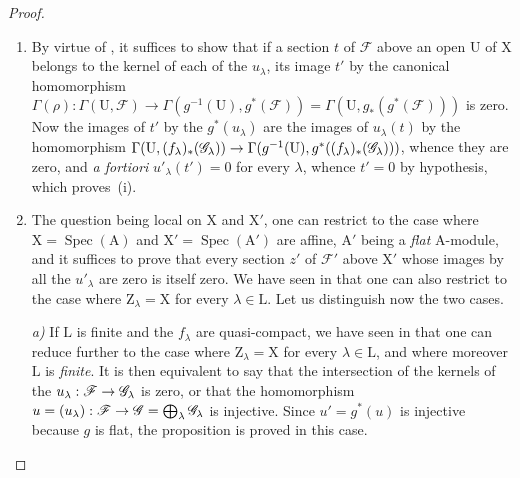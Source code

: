\begin{proof}
\begin{enumerate}[label=(\roman*)]
  \item By virtue of , it suffices to show that if a section $t$ of $\mathscr{F}$ above an open $\mathrm{U}$ of $\mathrm{X}$ belongs to the kernel of each of the $u_\lambda$, its image $t'$ by the canonical homomorphism $\Gamma(\rho):\Gamma(\mathrm{U},\mathscr{F})\to\Gamma(g^{-1}(\mathrm{U}),g^*(\mathscr{F}))=\Gamma(\mathrm{U},g_*(g^*(\mathscr{F})))$ is zero.
  Now the images of $t'$ by the $g^*(u_\lambda)$ are the images of $u_\lambda(t)$ by the homomorphism $\Gamma(\mathrm{U},(f_\lambda)_*(\mathscr{G}_\lambda))\to\Gamma(g^{-1}(\mathrm{U}),g^*((f_\lambda)_*(\mathscr{G}_\lambda)))$, whence they are zero, and \emph{a fortiori} $u'_\lambda(t')=0$ for every $\lambda$, whence $t'=0$ by hypothesis, which proves~(i).

  \item The question being local on $\mathrm{X}$ and $\mathrm{X}'$, one can restrict to the case where $\mathrm{X}=\operatorname{Spec}(\mathrm{A})$ and $\mathrm{X}'=\operatorname{Spec}(\mathrm{A}')$ are affine, $\mathrm{A}'$ being a \emph{flat} $\mathrm{A}$-module, and it suffices to prove that every section $z'$ of $\mathscr{F}'$ above $\mathrm{X}'$ whose images by all the $u'_\lambda$ are zero is itself zero.
  We have seen in  that one can also restrict to the case where $\mathrm{Z}_\lambda=\mathrm{X}$ for every $\lambda\in\mathrm{L}$.
  Let us distinguish now the two cases.
  \medskip

  \emph{a)} If $\mathrm{L}$ is finite and the $f_\lambda$ are quasi-compact, we have seen in  that one can reduce further to the case where $\mathrm{Z}_\lambda=\mathrm{X}$ for every $\lambda\in\mathrm{L}$, and where moreover $\mathrm{L}$ is \emph{finite}.
  It is then equivalent to say that the intersection of the kernels of the $u_\lambda:\mathscr{F}\to\mathscr{G}_\lambda$ is zero, or that the homomorphism $u=(u_\lambda):\mathscr{F}\to\mathscr{G}=\bigoplus_\lambda\mathscr{G}_\lambda$ is injective.
  Since $u'=g^*(u)$ is injective because $g$ is flat, the proposition is proved in this case.


\end{enumerate}
\end{proof}

